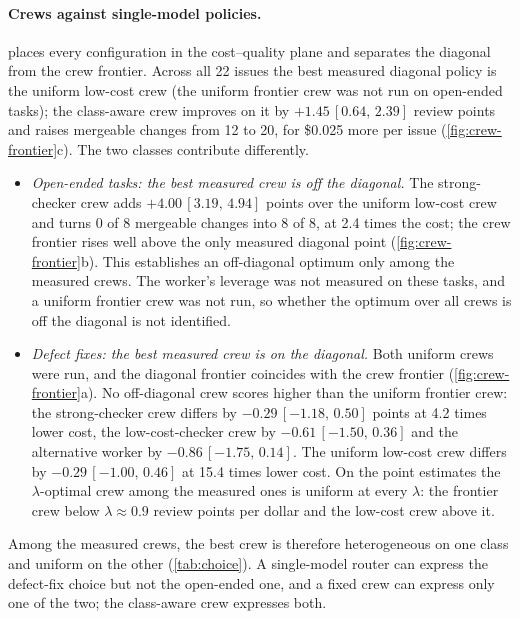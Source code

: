 \documentclass[11pt,a4paper]{article}
\theoremstyle{definition}
\theoremstyle{remark}
\theoremstyle{definition}
\newcommand{\ci}[2]{\,[#1,\,#2]}
\begin{document}
\paragraph{Crews against single-model policies.}
 places every configuration in the cost--quality plane and separates the diagonal from the crew frontier. Across all 22 issues the best measured diagonal policy is the uniform low-cost crew (the uniform frontier crew was not run on open-ended tasks); the class-aware crew improves on it by $+1.45\ci{0.64}{2.39}$ review points and raises mergeable changes from 12 to 20, for \$0.025 more per issue (\cref{fig:crew-frontier}c). The two classes contribute differently.
\begin{itemize}
\item \emph{Open-ended tasks: the best measured crew is off the diagonal.} The strong-checker crew adds $+4.00\ci{3.19}{4.94}$ points over the uniform low-cost crew and turns 0 of 8 mergeable changes into 8 of 8, at 2.4 times the cost; the crew frontier rises well above the only measured diagonal point (\cref{fig:crew-frontier}b). This establishes an off-diagonal optimum only among the measured crews. The worker's leverage was not measured on these tasks, and a uniform frontier crew was not run, so whether the optimum over all crews is off the diagonal is not identified.
\item \emph{Defect fixes: the best measured crew is on the diagonal.} Both uniform crews were run, and the diagonal frontier coincides with the crew frontier (\cref{fig:crew-frontier}a). No off-diagonal crew scores higher than the uniform frontier crew: the strong-checker crew differs by $-0.29\ci{-1.18}{0.50}$ points at 4.2 times lower cost, the low-cost-checker crew by $-0.61\ci{-1.50}{0.36}$ and the alternative worker by $-0.86\ci{-1.75}{0.14}$. The uniform low-cost crew differs by $-0.29\ci{-1.00}{0.46}$ at 15.4 times lower cost. On the point estimates the $\lambda$-optimal crew among the measured ones is uniform at every $\lambda$: the frontier crew below $\lambda\approx0.9$ review points per dollar and the low-cost crew above it.
\end{itemize}
Among the measured crews, the best crew is therefore heterogeneous on one class and uniform on the other (\cref{tab:choice}). A single-model router can express the defect-fix choice but not the open-ended one, and a fixed crew can express only one of the two; the class-aware crew expresses both.
\end{document}
